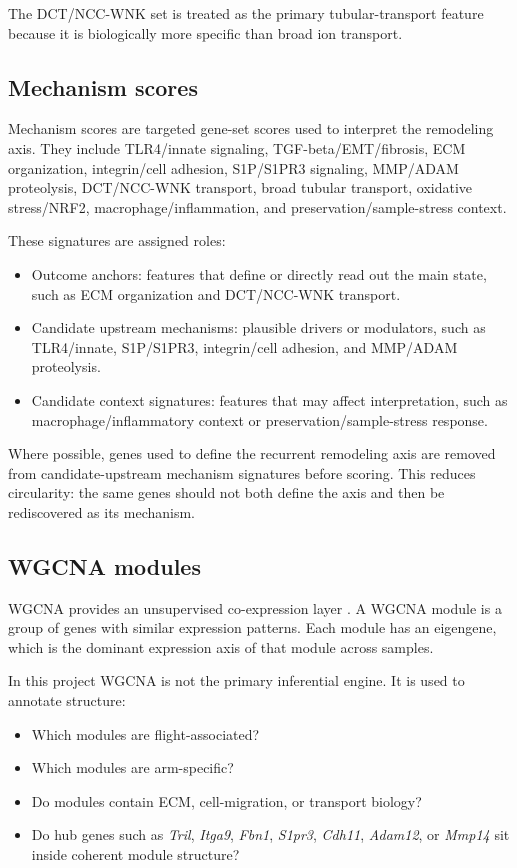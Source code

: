 \documentclass[11pt]{article}
\newcommand{\gene}[1]{\textit{#1}}
\begin{document}
The DCT/NCC-WNK set is treated as the primary tubular-transport feature because it is biologically more specific than broad ion transport.

\subsection{Mechanism scores}

Mechanism scores are targeted gene-set scores used to interpret the remodeling axis. They include TLR4/innate signaling, TGF-beta/EMT/fibrosis, ECM organization, integrin/cell adhesion, S1P/S1PR3 signaling, MMP/ADAM proteolysis, DCT/NCC-WNK transport, broad tubular transport, oxidative stress/NRF2, macrophage/inflammation, and preservation/sample-stress context.

These signatures are assigned roles:

\begin{itemize}
  \item Outcome anchors: features that define or directly read out the main state, such as ECM organization and DCT/NCC-WNK transport.
  \item Candidate upstream mechanisms: plausible drivers or modulators, such as TLR4/innate, S1P/S1PR3, integrin/cell adhesion, and MMP/ADAM proteolysis.
  \item Candidate context signatures: features that may affect interpretation, such as macrophage/inflammatory context or preservation/sample-stress response.
\end{itemize}

Where possible, genes used to define the recurrent remodeling axis are removed from candidate-upstream mechanism signatures before scoring. This reduces circularity: the same genes should not both define the axis and then be rediscovered as its mechanism.

\subsection{WGCNA modules}

WGCNA provides an unsupervised co-expression layer \citep{langfelder2008wgcna,langfelder2011preservation}. A WGCNA module is a group of genes with similar expression patterns. Each module has an eigengene, which is the dominant expression axis of that module across samples.

In this project WGCNA is not the primary inferential engine. It is used to annotate structure:

\begin{itemize}
  \item Which modules are flight-associated?
  \item Which modules are arm-specific?
  \item Do modules contain ECM, cell-migration, or transport biology?
  \item Do hub genes such as \gene{Tril}, \gene{Itga9}, \gene{Fbn1}, \gene{S1pr3}, \gene{Cdh11}, \gene{Adam12}, or \gene{Mmp14} sit inside coherent module structure?
\end{itemize}
\end{document}
